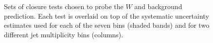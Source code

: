 \begin{figure}[h!]
  \begin{center}
     \\
     ~~
     \\
    \caption{Sets of closure tests chosen to probe the $W$ and \ttbar
      background prediction. Each test is overlaid on top of
      the systematic uncertainty estimates used for each of the seven
      \scalht bins (shaded bands) and for two different jet
      multiplicity bins (columns).}
    \label{fig:ZinvClosure}
  \end{center} 
\end{figure}

